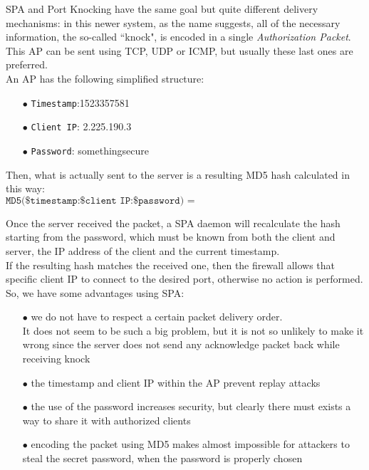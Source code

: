 \documentclass[12pt]{report}
\begin{document}
{SPA and Port Knocking have the same goal but quite different delivery mechanisms: in this newer system, as the name suggests, all of the necessary information, the so-called ``knock", is encoded in a single \emph{Authorization Packet}.\\
This AP can be sent using TCP, UDP or ICMP, but usually these last ones are preferred.\\
An AP has the following simplified structure:

\begin{itemize}
\setlength{\itemindent}{+4mm}
\item[$\bullet$] \texttt{Timestamp}:1523357581
\item[$\bullet$] \texttt{Client IP}: 2.225.190.3
\item[$\bullet$] \texttt{Password}: somethingsecure
\end{itemize}

Then, what is actually sent to the server is a resulting MD5 hash calculated in this way:
\small
$$ \texttt{MD5(\$timestamp:\$client IP:\$password) = 35b45e73c99905b675ffb05b78714eb9} $$

\normalsize
Once the server received the packet, a SPA daemon will recalculate the hash starting from the password, which must be known from both the client and server, the IP address of the client and the current timestamp.\\
If the resulting hash matches the received one, then the firewall allows that specific client IP to connect to the desired port, otherwise no action is performed.\\
So, we have some advantages using SPA:

\begin{itemize}
\setlength{\itemindent}{+4mm}
\item[$\bullet$] we do not have to respect a certain packet delivery order.\\
It does not seem to be such a big problem, but it is not so unlikely to make it wrong since the server does not send any acknowledge packet back while receiving knock
\item[$\bullet$] the timestamp and client IP within the AP prevent replay attacks
\item[$\bullet$] the use of the password increases security, but clearly there must exists a way to share it with authorized clients
\item[$\bullet$] encoding the packet using MD5 makes almost impossible for attackers to steal the secret password, when the password is properly chosen
\end{itemize}

}
\end{document}

